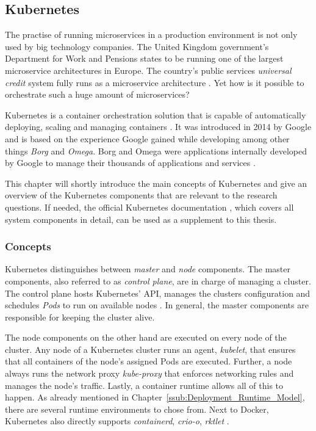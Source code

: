 
\subsection{Kubernetes}%
\label{sub:Kubernetes}

The practise of running microservices in a production environment is not only
used by big technology companies. The United Kingdom government's Department
for Work and Pensions states to be running one of the largest microservice
architectures in Europe. The country's public services \textit{universal
credit} system fully runs as a microservice architecture
\autocite{LoweLeadingwaymicroservices2016}. Yet how is it possible to
orchestrate such a huge amount of microservices?

Kubernetes is a container orchestration solution that is capable of
automatically deploying, scaling and managing containers
\autocite{AuthorsProductionGradeContainer}. It was introduced in 2014 by Google
and is based on the experience Google gained while developing among other
things \textit{Borg} and \textit{Omega}. Borg and Omega were applications
internally developed by Google to manage their thousands of applications and
services \autocite{LuksaKubernetesAction2017}.

This chapter will shortly introduce the main concepts of Kubernetes and give an
overview of the Kubernetes components that are relevant to the research
questions. If needed, the official Kubernetes documentation
\autocite{AuthorsProductionGradeContainer}, which covers all system components
in detail, can be used as a supplement to this thesis.

\subsubsection{Concepts}%
\label{ssub:Concepts}
Kubernetes distinguishes between \textit{master} and \textit{node} components.
The master components, also referred to as \textit{control plane}, are in
charge of managing a cluster. The control plane hosts Kubernetes' API, manages
the clusters configuration and schedules \textit{Pods} to run on available
nodes \autocite{AuthorsKubernetesComponents2019}. In general, the master
components are responsible for keeping the cluster alive.

The node components on the other hand are executed on every node of the
cluster. Any node of a Kubernetes cluster runs an agent, \textit{kubelet}, that
ensures that all containers of the node's assigned Pods are executed. Further,
a node always runs the network proxy \textit{kube-proxy} that enforces
networking rules and manages the node's traffic. Lastly, a container runtime
allows all of this to happen. As already mentioned in
Chapter~\ref{ssub:Deployment_Runtime_Model}, there are several runtime
environments to chose from. Next to Docker, Kubernetes also directly supports
\textit{containerd}, \textit{crio-o}, \textit{rktlet}
\autocite{AuthorsKubernetesComponents2019}.

